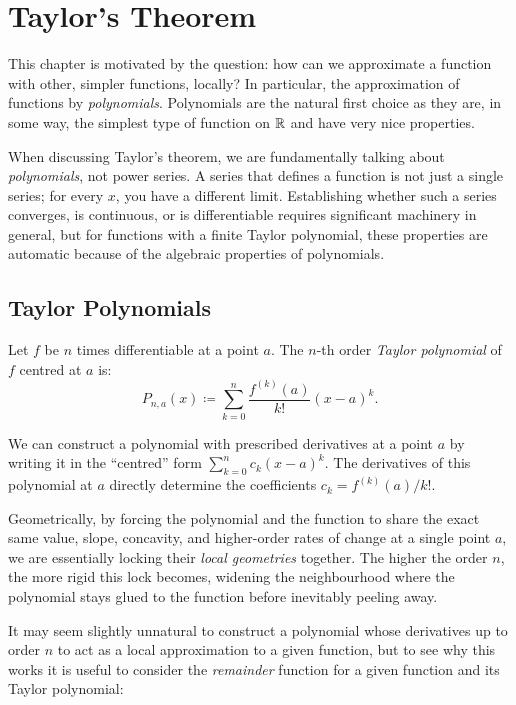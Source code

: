 \documentclass[../analysis1.tex]{subfiles}
\begin{document}
\chapter{Taylor's Theorem}

This chapter is motivated by the question: how can we approximate a function with other, simpler functions, locally? In particular, the approximation of functions by \textit{polynomials}. Polynomials are the natural first choice as they are, in some way, the simplest type of function on $\mathbb{R}$ and have very nice properties. 

When discussing Taylor's theorem, we are fundamentally talking about \textit{polynomials}, not power series. A series that defines a function is not just a single series; for every $x$, you have a different limit. Establishing whether such a series converges, is continuous, or is differentiable requires significant machinery in general, but for functions with a finite Taylor polynomial, these properties are automatic because of the algebraic properties of polynomials.

\section{Taylor Polynomials}

\begin{definition}
    \begin{shaded*}
        Let $f$ be $n$ times differentiable at a point $a$. The $n$-th order \textit{Taylor polynomial} of $f$ centred at $a$ is:
        \[
            P_{n,a}(x) \coloneqq \sum_{k=0}^n \frac{f^{(k)}(a)}{k!} (x-a)^k.
        \]
    \end{shaded*}
\end{definition}

\begin{remark}
    We can construct a polynomial with prescribed derivatives at a point $a$ by writing it in the ``centred'' form $\sum_{k=0}^n c_k(x-a)^k$. The derivatives of this polynomial at $a$ directly determine the coefficients $c_k = f^{(k)}(a)/k!$.
    
    Geometrically, by forcing the polynomial and the function to share the exact same value, slope, concavity, and higher-order rates of change at a single point $a$, we are essentially locking their \textit{local geometries} together. The higher the order $n$, the more rigid this lock becomes, widening the neighbourhood where the polynomial stays glued to the function before inevitably peeling away.

    It may seem slightly unnatural to construct a polynomial whose derivatives up to order $n$ to act as a local approximation to a given function, but to see why this works it is useful to consider the \textit{remainder} function for a given function and its Taylor polynomial:
\end{remark}
\end{document}
